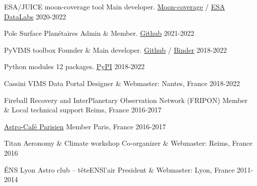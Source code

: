 
\begin{cventries}

  \cventry
    {ESA/JUICE moon-coverage tool}
    {Main developer.}
    {\href{https://moon-coverage.univ-nantes.fr}{Moon-coverage} /
     \href{https://datalabs.esa.int}{ESA DataLabs}}
    {2020-2022}
    {}

    \cventry
    {Pole Surface Planétaires}
    {Admin \& Member.}
    {\href{https://github.com/pole-surfaces-planetaires}{Github}}
    {2021-2022}
    {}

    \cventry
    {PyVIMS toolbox}
    {Founder \& Main developer.}
    {\href{https://github.com/seignovert/pyvims/tree/dev}{Github} /
     \href{https://mybinder.org/v2/gh/seignovert/pyvims/dev?filepath=notebooks/pyvims.ipynb}{Binder}}
    {2018-2022}
    {}

    \cventry
    {Python modules}
    {12 packages.}
    {\href{https://pypi.org/user/seignovert/}{PyPI}}
    {2018-2022}
    {}

  \cventry
    {Cassini VIMS Data Portal}
    {Designer \& Webmaster: }
    {Nantes, France}
    {2018-2022}
    {}

    \cventry
    {Fireball Recovery and InterPlanetary Observation Network (FRIPON)}
    {Member \& Local technical support}
    {Reims, France}
    {2016-2017}
    {}

  \cventry
    {\href{https://cafeastroparisien.wordpress.com/}{Astro-Café Parisien}}
    {Member}
    {Paris, France}
    {2016-2017}
    {}

  \cventry
    {Titan Aeronomy \& Climate workshop}
    {Co-organizer \& Webmaster: }
    {Reims, France}
    {2016}
    {}

  \cventry
    {ÉNS Lyon Astro club -- têteENSl'air}
    {President \& Webmaster: }
    {Lyon, France}
    {2011-2014}
    {}

\end{cventries}
